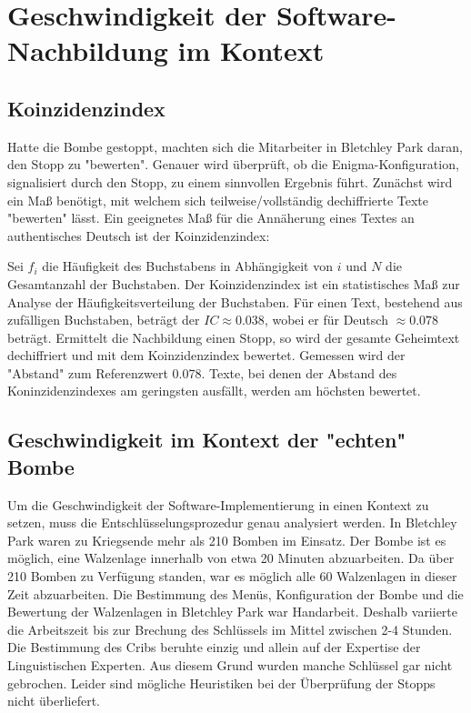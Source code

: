 \chapter{Geschwindigkeit der Software-Nachbildung im Kontext}\label{ch:speed}

\section{Koinzidenzindex}\label{sec:koinzidenzindex}
Hatte die Bombe gestoppt, machten sich die Mitarbeiter in Bletchley Park daran, den Stopp zu "bewerten". 
Genauer wird überprüft, ob die Enigma-Konfiguration, signalisiert durch den Stopp, zu einem sinnvollen Ergebnis führt.
Zunächst wird ein Maß benötigt, mit welchem sich teilweise/vollständig dechiffrierte Texte "bewerten" lässt.
Ein geeignetes Maß für die Annäherung eines Textes an authentisches Deutsch ist der Koinzidenzindex:

	
	
Sei $f_i$ die Häufigkeit des Buchstabens in Abhängigkeit von $i$ und $N$ die Gesamtanzahl der Buchstaben.
Der Koinzidenzindex ist ein statistisches Maß zur Analyse der Häufigkeitsverteilung der Buchstaben.
Für einen Text, bestehend aus zufälligen Buchstaben, beträgt der $IC \approx 0.038$, wobei er für Deutsch $\approx 0.078$ beträgt.
Ermittelt die Nachbildung einen Stopp, so wird der gesamte Geheimtext dechiffriert und mit dem Koinzidenzindex bewertet.
Gemessen wird der "Abstand" zum Referenzwert 0.078.
Texte, bei denen der Abstand des Koninzidenzindexes am geringsten ausfällt, werden am höchsten bewertet.


\section{Geschwindigkeit im Kontext der "echten" Bombe}\label{sec:speed}
Um die Geschwindigkeit der Software-Implementierung in einen Kontext zu setzen, muss die Entschlüsselungsprozedur genau analysiert werden.
In Bletchley Park waren zu Kriegsende mehr als 210 Bomben im Einsatz.
Der Bombe ist es möglich, eine Walzenlage innerhalb von etwa 20 Minuten abzuarbeiten.
Da über 210 Bomben zu Verfügung standen, war es möglich alle 60 Walzenlagen in dieser Zeit abzuarbeiten.
Die Bestimmung des Menüs, Konfiguration der Bombe und die Bewertung der Walzenlagen in Bletchley Park war Handarbeit.
Deshalb variierte die Arbeitszeit bis zur Brechung des Schlüssels im Mittel zwischen 2-4 Stunden.
Die Bestimmung des Cribs beruhte einzig und allein auf der Expertise der Linguistischen Experten. 
Aus diesem Grund wurden manche Schlüssel gar nicht gebrochen.
Leider sind mögliche Heuristiken bei der Überprüfung der Stopps nicht überliefert.

